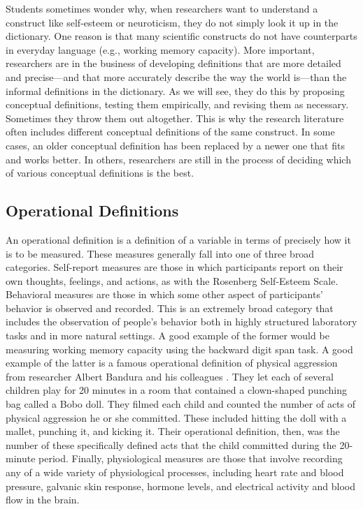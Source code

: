 Students sometimes wonder why, when researchers want to understand a construct like self-esteem or neuroticism, they do not simply look it up in the dictionary. One reason is that many scientific constructs do not have counterparts in everyday language (e.g., working memory capacity). More important, researchers are in the business of developing definitions that are more detailed and precise—and that more accurately describe the way the world is—than the informal definitions in the dictionary. As we will see, they do this by proposing conceptual definitions, testing them empirically, and revising them as necessary. Sometimes they throw them out altogether. This is why the research literature often includes different conceptual definitions of the same construct. In some cases, an older conceptual definition has been replaced by a newer one that fits and works better. In others, researchers are still in the process of deciding which of various conceptual definitions is the best.

\subsection{Operational Definitions}

An operational definition is a definition of a variable in terms of precisely how it is to be measured. These measures generally fall into one of three broad categories. Self-report measures are those in which participants report on their own thoughts, feelings, and actions, as with the Rosenberg Self-Esteem Scale. Behavioral measures are those in which some other aspect of participants' behavior is observed and recorded. This is an extremely broad category that includes the observation of people's behavior both in highly structured laboratory tasks and in more natural settings. A good example of the former would be measuring working memory capacity using the backward digit span task. A good example of the latter is a famous operational definition of physical aggression from researcher Albert Bandura and his colleagues \citep{bandura_transmission_2006}. They let each of several children play for 20 minutes in a room that contained a clown-shaped punching bag called a Bobo doll. They filmed each child and counted the number of acts of physical aggression he or she committed. These included hitting the doll with a mallet, punching it, and kicking it. Their operational definition, then, was the number of these specifically defined acts that the child committed during the 20-minute period. Finally, physiological measures are those that involve recording any of a wide variety of physiological processes, including heart rate and blood pressure, galvanic skin response, hormone levels, and electrical activity and blood flow in the brain.

